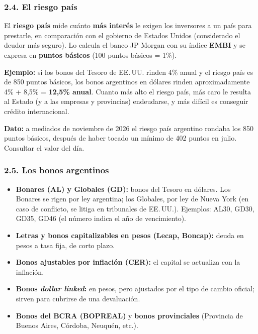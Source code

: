 \subsubsection*{2.4. El riesgo país}
El \textbf{riesgo país} mide cuánto \textbf{más interés} le exigen los inversores a un país
para prestarle, en comparación con el gobierno de Estados Unidos (considerado el deudor más
seguro). Lo calcula el banco JP Morgan con su índice \textbf{EMBI} y se expresa en
\textbf{puntos básicos} (100 puntos básicos = 1\%).

\begin{recuadro}
\textbf{Ejemplo:} si los bonos del Tesoro de EE.\,UU. rinden 4\% anual y el riesgo país es de
850 puntos básicos, los bonos argentinos en dólares rinden aproximadamente
4\% + 8,5\% = \textbf{12,5\% anual}. Cuanto más alto el riesgo país, más caro le resulta al
Estado (y a las empresas y provincias) endeudarse, y más difícil es conseguir crédito
internacional.

\textbf{Dato:} a mediados de noviembre de 2026 el riesgo país argentino rondaba los 850 puntos
básicos, después de haber tocado un mínimo de 402 puntos en julio. Consultar el valor del día.
\end{recuadro}

\subsubsection*{2.5. Los bonos argentinos}
\begin{itemize}
  \item \textbf{Bonares (AL) y Globales (GD):} bonos del Tesoro en dólares. Los Bonares se rigen
        por ley argentina; los Globales, por ley de Nueva York (en caso de conflicto, se
        litiga en tribunales de EE.\,UU.). Ejemplos: AL30, GD30, GD35, GD46 (el número indica
        el año de vencimiento).
  \item \textbf{Letras y bonos capitalizables en pesos (Lecap, Boncap):} deuda en pesos a tasa
        fija, de corto plazo.
  \item \textbf{Bonos ajustables por inflación (CER):} el capital se actualiza con la inflación.
  \item \textbf{Bonos \textit{dollar linked}:} en pesos, pero ajustados por el tipo de cambio
        oficial; sirven para cubrirse de una devaluación.
  \item \textbf{Bonos del BCRA (BOPREAL)} y \textbf{bonos provinciales} (Provincia de Buenos
        Aires, Córdoba, Neuquén, etc.).
\end{itemize}

